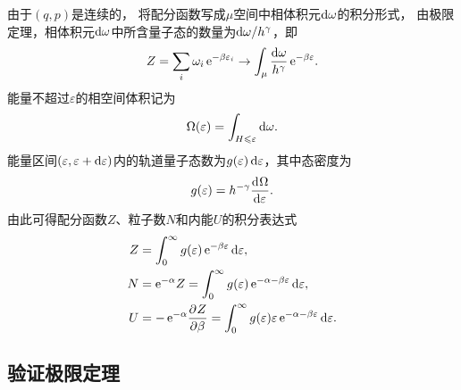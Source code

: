 \begin{corollary}
	由于$(q,p)$是连续的，
	将配分函数写成$\mu$空间中相体积元$\mathop{}\!\mathrm{d}\omega$的积分形式，
	由极限定理，相体积元$\mathop{}\!\mathrm{d}\omega$中所含量子态的数量为$\mathop{}\!\mathrm{d}\omega/h^\gamma$，即
	\begin{equation}
		\label{eq:sm-semiclassical-one-particle-partition}
		Z = \sum_i \omega_i\mathop{}\!\mathrm{e}^{-\beta\varepsilon_i} \to \int_\mu\frac{\mathrm{d}\omega}{h^\gamma}\mathop{}\!\mathrm{e}^{-\beta\varepsilon}.
	\end{equation}
	能量不超过$\varepsilon$的相空间体积记为
	\begin{equation}
		\label{eq:sm-cumulative-phase-volume}
		\Omega(\varepsilon) = \int_{H\leqslant\varepsilon}\mathop{}\!\mathrm{d}\omega.
	\end{equation}
	能量区间$(\varepsilon,\varepsilon + \mathop{}\!\mathrm{d}\varepsilon)$内的轨道量子态数为$g(\varepsilon)\mathop{}\!\mathrm{d}\varepsilon$，其中态密度为
	\begin{equation}
		g(\varepsilon) = h^{-\gamma}\frac{\mathop{}\!\mathrm{d}^{}\Omega}{\mathrm{d}{\varepsilon}^{}}.
	\end{equation}
	由此可得配分函数$Z$、粒子数$N$和内能$U$的积分表达式
	\begin{subequations}
		\begin{align}
			Z &= \intRplus g(\varepsilon)\e^{-\beta\varepsilon}\d\varepsilon,\\
			N &= \e^{-\alpha}Z = \intRplus g(\varepsilon)\e^{-\alpha-\beta\varepsilon}\d\varepsilon,\\
			U &= -\e^{-\alpha}\pv Z\beta = \intRplus g(\varepsilon)\varepsilon\e^{-\alpha-\beta\varepsilon}\d\varepsilon.
		\end{align}
	\end{subequations}
\end{corollary}

\subsection*{验证极限定理}

